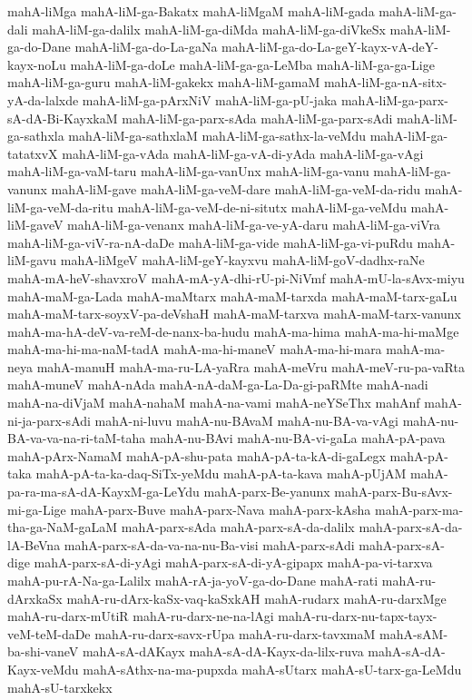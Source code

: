 {mahA-liMga
mahA-liM-ga-Bakatx
mahA-liMgaM
mahA-liM-gada
mahA-liM-ga-dali
mahA-liM-ga-dalilx
mahA-liM-ga-diMda
mahA-liM-ga-diVkeSx
mahA-liM-ga-do-Dane
mahA-liM-ga-do-La-gaNa
mahA-liM-ga-do-La-geY-kayx-vA-deY-kayx-noLu
mahA-liM-ga-doLe
mahA-liM-ga-ga-LeMba
mahA-liM-ga-ga-Lige
mahA-liM-ga-guru
mahA-liM-gakekx
mahA-liM-gamaM
mahA-liM-ga-nA-sitx-yA-da-lalxde
mahA-liM-ga-pArxNiV
mahA-liM-ga-pU-jaka
mahA-liM-ga-parx-sA-dA-Bi-KayxkaM
mahA-liM-ga-parx-sAda
mahA-liM-ga-parx-sAdi
mahA-liM-ga-sathxla
mahA-liM-ga-sathxlaM
mahA-liM-ga-sathx-la-veMdu
mahA-liM-ga-tatatxvX
mahA-liM-ga-vAda
mahA-liM-ga-vA-di-yAda
mahA-liM-ga-vAgi
mahA-liM-ga-vaM-taru
mahA-liM-ga-vanUnx
mahA-liM-ga-vanu
mahA-liM-ga-vanunx
mahA-liM-gave
mahA-liM-ga-veM-dare
mahA-liM-ga-veM-da-ridu
mahA-liM-ga-veM-da-ritu
mahA-liM-ga-veM-de-ni-situtx
mahA-liM-ga-veMdu
mahA-liM-gaveV
mahA-liM-ga-venanx
mahA-liM-ga-ve-yA-daru
mahA-liM-ga-viVra
mahA-liM-ga-viV-ra-nA-daDe
mahA-liM-ga-vide
mahA-liM-ga-vi-puRdu
mahA-liM-gavu
mahA-liMgeV
mahA-liM-geY-kayxvu
mahA-liM-goV-dadhx-raNe
mahA-mA-heV-shavxroV
mahA-mA-yA-dhi-rU-pi-NiVmf
mahA-mU-la-sAvx-miyu
mahA-maM-ga-Lada
mahA-maMtarx
mahA-maM-tarxda
mahA-maM-tarx-gaLu
mahA-maM-tarx-soyxV-pa-deVshaH
mahA-maM-tarxva
mahA-maM-tarx-vanunx
mahA-ma-hA-deV-va-reM-de-nanx-ba-hudu
mahA-ma-hima
mahA-ma-hi-maMge
mahA-ma-hi-ma-naM-tadA
mahA-ma-hi-maneV
mahA-ma-hi-mara
mahA-ma-neya
mahA-manuH
mahA-ma-ru-LA-yaRra
mahA-meVru
mahA-meV-ru-pa-vaRta
mahA-muneV
mahA-nAda
mahA-nA-daM-ga-La-Da-gi-paRMte
mahA-nadi
mahA-na-diVjaM
mahA-nahaM
mahA-na-vami
mahA-neYSeThx
mahAnf
mahA-ni-ja-parx-sAdi
mahA-ni-luvu
mahA-nu-BAvaM
mahA-nu-BA-va-vAgi
mahA-nu-BA-va-va-na-ri-taM-taha
mahA-nu-BAvi
mahA-nu-BA-vi-gaLa
mahA-pA-pava
mahA-pArx-NamaM
mahA-pA-shu-pata
mahA-pA-ta-kA-di-gaLegx
mahA-pA-taka
mahA-pA-ta-ka-daq-SiTx-yeMdu
mahA-pA-ta-kava
mahA-pUjAM
mahA-pa-ra-ma-sA-dA-KayxM-ga-LeYdu
mahA-parx-Be-yanunx
mahA-parx-Bu-sAvx-mi-ga-Lige
mahA-parx-Buve
mahA-parx-Nava
mahA-parx-kAsha
mahA-parx-ma-tha-ga-NaM-gaLaM
mahA-parx-sAda
mahA-parx-sA-da-dalilx
mahA-parx-sA-da-lA-BeVna
mahA-parx-sA-da-va-na-nu-Ba-visi
mahA-parx-sAdi
mahA-parx-sA-dige
mahA-parx-sA-di-yAgi
mahA-parx-sA-di-yA-gipapx
mahA-pa-vi-tarxva
mahA-pu-rA-Na-ga-Lalilx
mahA-rA-ja-yoV-ga-do-Dane
mahA-rati
mahA-ru-dArxkaSx
mahA-ru-dArx-kaSx-vaq-kaSxkAH
mahA-rudarx
mahA-ru-darxMge
mahA-ru-darx-mUtiR
mahA-ru-darx-ne-na-lAgi
mahA-ru-darx-nu-tapx-tayx-veM-teM-daDe
mahA-ru-darx-savx-rUpa
mahA-ru-darx-tavxmaM
mahA-sAM-ba-shi-vaneV
mahA-sA-dAKayx
mahA-sA-dA-Kayx-da-lilx-ruva
mahA-sA-dA-Kayx-veMdu
mahA-sAthx-na-ma-pupxda
mahA-sUtarx
mahA-sU-tarx-ga-LeMdu
mahA-sU-tarxkekx
}
